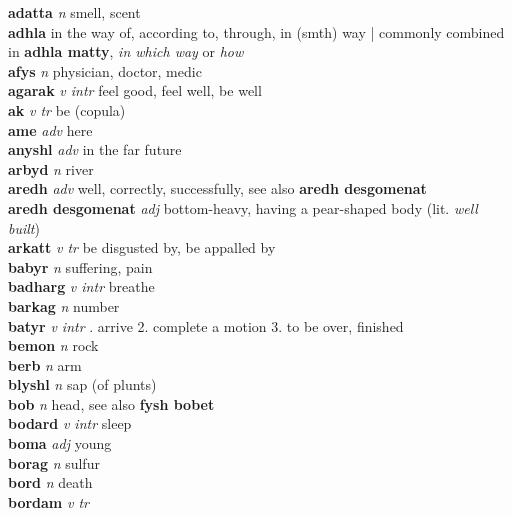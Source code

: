 \textbf{adatta}   \emph{n} \textperiodcentered smell, scent\\\textbf{adhla}    \textperiodcentered in the way of, according to, through, in (smth) way | commonly combined in \textbf{adhla matty}, \emph{in which way} or \emph{how}\\\textbf{afys}   \emph{n} \textperiodcentered physician, doctor, medic\\\textbf{agarak}   \emph{v intr} \textperiodcentered feel good, feel well, be well\\\textbf{ak}   \emph{v tr} \textperiodcentered be (copula)\\\textbf{ame}   \emph{adv} \textperiodcentered here\\\textbf{anyshl}   \emph{adv} \textperiodcentered in the far future\\\textbf{arbyd}   \emph{n} \textperiodcentered river\\\textbf{aredh}   \emph{adv} \textperiodcentered well, correctly, successfully, see also \textbf{aredh desgomenat}\\\textbf{aredh desgomenat}   \emph{adj} \textperiodcentered bottom-heavy, having a pear-shaped body (lit. \emph{well built})\\\textbf{arkatt}   \emph{v tr} \textperiodcentered be disgusted by, be appalled by\\\textbf{babyr}   \emph{n} \textperiodcentered suffering, pain\\\textbf{badharg}   \emph{v intr} \textperiodcentered breathe\\\textbf{barkag}   \emph{n} \textperiodcentered number\\\textbf{batyr}   \emph{v intr} . arrive 2. complete a motion 3. to be over, finished \\\textbf{bemon}   \emph{n} \textperiodcentered rock\\\textbf{berb}   \emph{n} \textperiodcentered arm\\\textbf{blyshl}   \emph{n} \textperiodcentered sap (of plunts)\\\textbf{bob}   \emph{n} \textperiodcentered head, see also \textbf{fysh bobet}\\\textbf{bodard}   \emph{v intr} \textperiodcentered sleep\\\textbf{boma}   \emph{adj} \textperiodcentered young\\\textbf{borag}   \emph{n} \textperiodcentered sulfur\\\textbf{bord}   \emph{n} \textperiodcentered death\\\textbf{bordam}   \emph{v tr} 